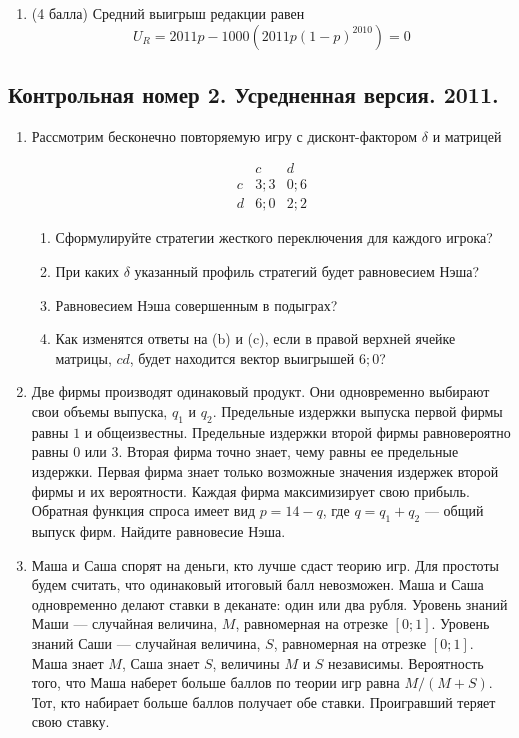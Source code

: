 \documentclass[pdftex,12pt,a4paper]{article}
\begin{document}
\begin{enumerate}
\begin{enumerate}
\item (4 балла) Средний выигрыш редакции равен
\begin{equation}
U_{R}=2011p-1000(2011p(1-p)^{2010})=0
\end{equation}
\end{enumerate}


\end{enumerate}

\subsection{Контрольная номер 2. Усредненная версия. 2011.} 

\begin{enumerate}
\item Рассмотрим бесконечно повторяемую игру с дисконт-фактором $\delta$ и матрицей

\begin{equation}
\begin{array}{c|cc}
 & c & d \\ 
\hline
c & 3;3 & 0;6 \\ 
d & 6;0 & 2;2
\end{array} 
\end{equation}

\begin{enumerate}
\item Сформулируйте стратегии жесткого переключения для каждого игрока?
\item При каких $\delta$ указанный профиль стратегий будет равновесием Нэша?
\item Равновесием Нэша совершенным в подыграх?
\item Как изменятся ответы на (b) и (c), если в правой верхней ячейке матрицы, $cd$, будет находится вектор выигрышей $6;0$?
\end{enumerate}


\item Две фирмы производят одинаковый продукт. Они одновременно выбирают свои объемы выпуска, $q_1$ и $q_2$. Предельные издержки выпуска первой фирмы равны $1$ и общеизвестны. Предельные издержки второй фирмы равновероятно равны $0$ или $3$. Вторая фирма точно знает, чему равны ее предельные издержки. Первая фирма знает только возможные значения издержек второй фирмы и их вероятности. Каждая фирма максимизирует свою прибыль. Обратная функция спроса имеет вид $p=14-q$, где $q=q_1+q_2$ --- общий выпуск фирм. Найдите равновесие Нэша.

\item Маша и Саша спорят на деньги, кто лучше сдаст теорию игр. Для простоты будем считать, что одинаковый итоговый балл невозможен. Маша и Саша одновременно делают ставки в деканате: один или два рубля. Уровень знаний Маши --- случайная величина, $M$, равномерная на отрезке $[0;1]$. Уровень знаний Саши --- случайная величина, $S$, равномерная на отрезке $[0;1]$. Маша знает $M$, Саша знает $S$, величины $M$ и $S$ независимы. Вероятность того, что Маша наберет больше баллов по теории игр равна $M/(M+S)$. Тот, кто набирает больше баллов получает обе ставки. Проигравший теряет свою ставку. 


\end{enumerate}
\end{document}
